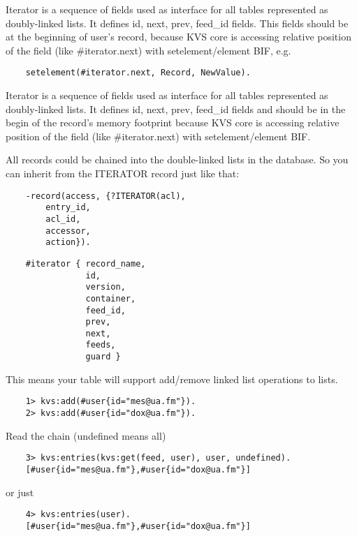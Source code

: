 Iterator is a sequence of fields used as interface for all tables
represented as doubly-linked lists. It defines id, next, prev,
feed_id fields. This fields should be at the beginning of user's record,
because KVS core is accessing relative position of the
field (like #iterator.next) with setelement/element BIF, e.g.

\begin{lstlisting}
    setelement(#iterator.next, Record, NewValue).
\end{lstlisting}

Iterator is a sequence of fields used as interface for all tables
represented as doubly-linked lists. It defines id, next, prev, feed_id fields and
should be in the begin of the record's memory footprint because KVS core is accessing
relative position of the field (like #iterator.next) with setelement/element BIF.

All records could be chained into the double-linked lists in the database.
So you can inherit from the ITERATOR record just like that:

\begin{lstlisting}
    -record(access, {?ITERATOR(acl),
        entry_id,
        acl_id,
        accessor,
        action}).
\end{lstlisting}

\begin{lstlisting}
    #iterator { record_name,
                id,
                version,
                container,
                feed_id,
                prev,
                next,
                feeds,
                guard }
\end{lstlisting}

This means your table will support add/remove linked list operations to lists.

\begin{lstlisting}
    1> kvs:add(#user{id="mes@ua.fm"}).
    2> kvs:add(#user{id="dox@ua.fm"}).
\end{lstlisting}

Read the chain (undefined means all)

\begin{lstlisting}
    3> kvs:entries(kvs:get(feed, user), user, undefined).
    [#user{id="mes@ua.fm"},#user{id="dox@ua.fm"}]
\end{lstlisting}

or just

\begin{lstlisting}
    4> kvs:entries(user).
    [#user{id="mes@ua.fm"},#user{id="dox@ua.fm"}]
\end{lstlisting}

